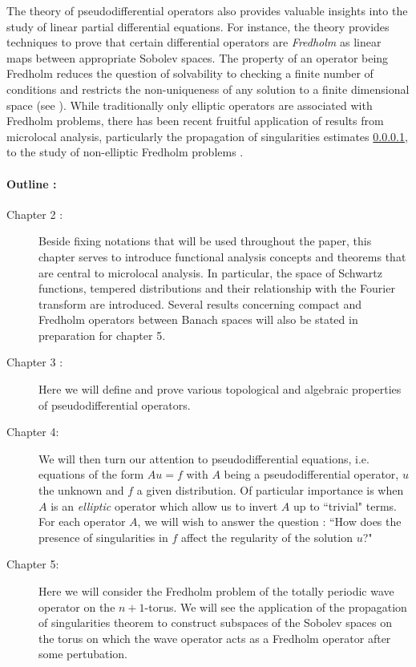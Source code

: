 \documentclass[12pt, twoside]{book}
\begin{document}
The theory of pseudodifferential operators also provides valuable insights into the study of linear partial differential equations. For instance, the theory provides techniques to prove that certain differential operators are \textit{Fredholm} as linear maps between appropriate Sobolev spaces. The property of an operator being Fredholm reduces the question of solvability to checking a finite number of conditions and restricts the non-uniqueness of any solution to a finite dimensional space (see \cite{}). While traditionally only elliptic operators are associated with Fredholm problems, there has been recent fruitful application of results from microlocal analysis, particularly the propagation of singularities estimates \ref{}, to the study of non-elliptic Fredholm problems \cite{}. \\


\paragraph{\Large Outline : }\hfill 
\begin{description}
    \item[Chapter 2 :] Beside fixing notations that will be used throughout the paper, this chapter serves to introduce functional analysis concepts and theorems that are central to microlocal analysis. In particular, the space of Schwartz functions, tempered distributions and their relationship with the Fourier transform are introduced. Several results concerning compact and Fredholm operators between Banach spaces will also be stated in preparation for chapter 5. 
    
    \item[Chapter 3 :] Here we will define and prove various topological and algebraic properties of pseudodifferential operators. 
    
    \item[Chapter 4: ] We will then turn our attention to pseudodifferential equations, i.e. equations of the form $Au = f$ with $A$ being a pseudodifferential operator, $u$ the unknown and $f$ a given distribution. Of particular importance is when $A$ is an \textit{elliptic} operator which allow us to invert $A$ up to ``trivial" terms. For each operator $A$, we will wish to answer the question : ``How does the presence of singularities in $f$ affect the regularity of the solution $u$?" 
    
    \item[Chapter 5: ] Here we will consider the Fredholm problem of the totally periodic wave operator on the $n + 1$-torus. We will see the application of the propagation of singularities theorem to construct subspaces of the Sobolev spaces on the torus on which the wave operator acts as a Fredholm operator after some pertubation. 
    
\end{description}
\end{document}
